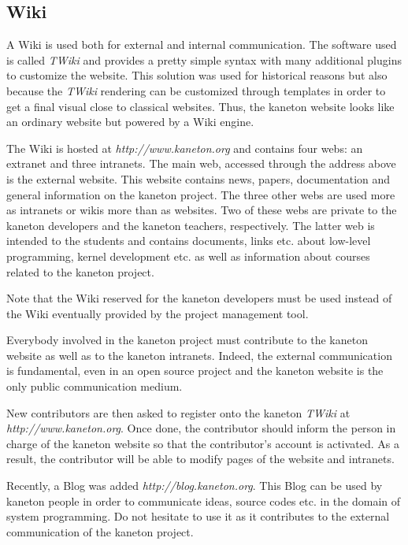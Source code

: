%
%
%
%
%
%

%
%

\subsection{Wiki}
\label{section:wiki}

A Wiki is used both for external and internal communication. The software
used is called \textit{TWiki} and provides a pretty simple syntax with
many additional plugins to customize the website. This solution was used
for historical reasons but also because the \textit{TWiki} rendering can
be customized through templates in order to get a final visual close to
classical websites. Thus, the kaneton website looks like an ordinary
website but powered by a Wiki engine.

The Wiki is hosted at \textit{http://www.kaneton.org} and contains four
webs: an extranet and three intranets. The main web, accessed through the
address above is the external website. This website contains news, papers,
documentation and general information on the kaneton project. The three other
webs are used more as intranets or wikis more than as websites. Two of these
webs are private to the kaneton developers and the kaneton teachers,
respectively. The latter web is intended to the students and contains
documents, links etc. about low-level programming, kernel development etc.
as well as information about courses related to the kaneton project.

Note that the Wiki reserved for the kaneton developers must be used
instead of the Wiki eventually provided by the project management tool.

Everybody involved in the kaneton project must contribute to the kaneton
website as well as to the kaneton intranets. Indeed, the external communication
is fundamental, even in an open source project and the kaneton website is
the only public communication medium.

New contributors are then asked to register onto the kaneton \textit{TWiki}
at \textit{http://www.kaneton.org}. Once done, the contributor should
inform the person in charge of the kaneton website so that  the contributor's
account is activated. As a result, the contributor will be able to modify
pages of the website and intranets.

Recently, a Blog was added \textit{http://blog.kaneton.org}. This Blog can
be used by kaneton people in order to communicate ideas, source codes etc.
in the domain of system programming. Do not hesitate to use it as it
contributes to the external communication of the kaneton project.
